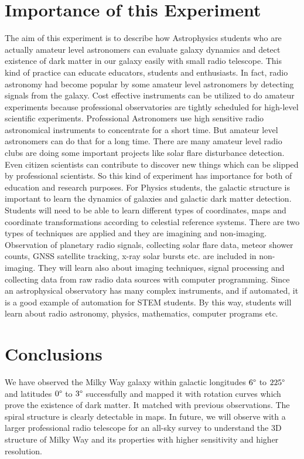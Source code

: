 \documentclass[conference]{IEEEtran}
\begin{document}
\section{Importance of this Experiment}
The aim of this experiment is to describe how Astrophysics students who are actually amateur level astronomers can evaluate galaxy dynamics and detect existence of dark matter in our galaxy easily with small radio telescope. This kind of practice can educate educators, students and enthusiasts. In fact, radio astronomy had become popular by some amateur level astronomers by detecting signals from the galaxy. Cost effective instruments can be utilized to do amateur experiments because professional observatories are tightly scheduled for high-level scientific experiments. Professional Astronomers use high sensitive radio astronomical instruments to concentrate for a short time. But amateur level astronomers can do that for a long time. There are many amateur level radio clubs are doing some important projects like solar flare disturbance detection. Even citizen scientists can contribute to discover new things which can be slipped by professional scientists. So this kind of experiment has importance for both of education and research purposes. For Physics students, the galactic structure is important to learn the dynamics of galaxies and galactic dark matter detection. Students will need to be able to learn different types of coordinates, maps and coordinate transformations according to celestial reference systems. There are two types of techniques are applied and they are imagining and non-imaging. Observation of planetary radio signals, collecting solar flare data, meteor shower counts, GNSS satellite tracking, x-ray solar bursts etc. are included in non-imaging. They will learn also about imaging techniques, signal processing and collecting data from raw radio data sources with computer programming. Since an astrophysical observatory has many complex instruments, and if automated, it is a good example of automation for STEM students. By this way, students will learn about radio astronomy, physics, mathematics, computer programs etc.



\section{Conclusions}

We have observed the Milky Way galaxy within galactic longitudes $6\degree$ to $225\degree$ and latitudes $0\degree$ to $3\degree$ successfully and mapped it with rotation curves which prove the existence of dark matter. It matched with previous observations. The spiral structure is clearly detectable in maps. In future, we will observe with a larger professional radio telescope for an all-sky survey to understand the 3D structure of Milky Way and its properties with higher sensitivity and higher resolution.
\end{document}
